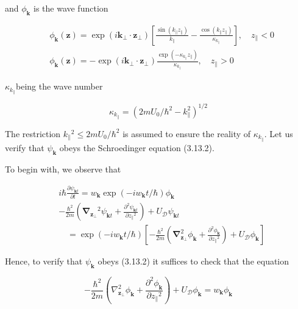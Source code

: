 \documentclass{article}
\begin{document}
and $\phi_{\boldsymbol{k}}$ is the wave function
 
\begin{align*}
& \phi_{\boldsymbol{k}}(\boldsymbol{z})=\exp \left(i \boldsymbol{k}_{\perp} \cdot \boldsymbol{z}_{\perp}\right)\left[\frac{\sin \left(k_{\|} z_{\|}\right)}{k_{\|}}-\frac{\cos \left(k_{\|} z_{\|}\right)}{\kappa_{k_{\|}}}\right], \quad z_{\|}<0  \tag{3.13.9}\\
& \phi_{\boldsymbol{k}}(\boldsymbol{z})=-\exp \left(i \boldsymbol{k}_{\perp} \cdot \boldsymbol{z}_{\perp}\right) \frac{\exp \left(-\kappa_{k_{\|}} z_{\|}\right)}{\kappa_{k_{\|}}}, \quad z_{\|}>0
\end{align*}
 
$\kappa_{k_{\|}}$being the wave number
 
\begin{equation*}
\kappa_{k_{\|}}=\left(2 m U_{0} / \hbar^{2}-k_{\|}^{2}\right)^{1 / 2} \tag{3.13.10}
\end{equation*}
 

The restriction $k_{\|}{ }^{2} \leq 2 m U_{0} / \hbar^{2}$ is assumed to ensure the reality of $\kappa_{k_{\|}}$. Let us verify that $\psi_{\boldsymbol{k}}$ obeys the Schroedinger equation (3.13.2).

To begin with, we observe that
 
\begin{align*}
& i \hbar \frac{\partial \psi_{\boldsymbol{k} t}}{\partial t}=w_{\boldsymbol{k}} \exp \left(-i w_{\boldsymbol{k}} t / \hbar\right) \phi_{\boldsymbol{k}}  \tag{3.13.11}\\
& -\frac{\hbar^{2}}{2 m}\left(\boldsymbol{\nabla}_{\boldsymbol{z}_{\perp}}{ }^{2} \psi_{\boldsymbol{k} t}+\frac{\partial^{2} \psi_{\boldsymbol{k} t}}{\partial z_{\|}{ }^{2}}\right)+U_{\mathcal{D}} \psi_{\boldsymbol{k} t}  \tag{3.13.12}\\
& \quad=\exp \left(-i w_{\boldsymbol{k}} t / \hbar\right)\left[-\frac{\hbar^{2}}{2 m}\left(\boldsymbol{\nabla}_{\boldsymbol{z}_{\perp}}^{2} \phi_{\boldsymbol{k}}+\frac{\partial^{2} \phi_{\boldsymbol{k}}}{\partial z_{\|}{ }^{2}}\right)+U_{\mathcal{D}} \phi_{\boldsymbol{k}}\right]
\end{align*}
 

Hence, to verify that $\psi_{\boldsymbol{k}}$ obeys (3.13.2) it suffices to check that the equation
 
\begin{equation*}
-\frac{\hbar^{2}}{2 m}\left(\nabla_{\boldsymbol{z}_{\perp}}^{2} \phi_{\boldsymbol{k}}+\frac{\partial^{2} \phi_{\boldsymbol{k}}}{\partial z_{\|}{ }^{2}}\right)+U_{\mathcal{D}} \phi_{\boldsymbol{k}}=w_{\boldsymbol{k}} \phi_{\boldsymbol{k}} \tag{3.13.13}
\end{equation*}
 
\end{document}
